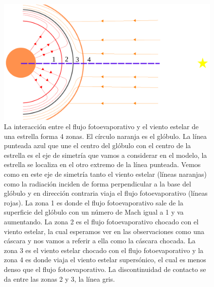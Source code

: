 \documentclass{book}
\begin{document}
\begin{figure}[htb]
    \centering    \includegraphics[width=\textwidth]{imagenes_corregidas/Arreglo 01.pdf}
    \caption{La interacción entre el flujo fotoevaporativo y el viento
      estelar de una estrella forma 4 zonas. El círculo naranja es el
      glóbulo. La línea punteada azul que une el centro del glóbulo
      con el centro de la estrella es el eje de simetría que vamos a
      considerar en el modelo, la estrella se localiza en el otro
      extremo de la línea punteada. Vemos como en este eje de simetría
      tanto el viento estelar (líneas naranjas) como la radiación
      inciden de forma perpendicular a la base del glóbulo y en
      dirección contraria viaja el flujo fotoevaporativo (líneas
      rojas). La zona 1 es donde el flujo fotoevaporativo sale de la
      superficie del glóbulo con un número de Mach igual a 1 y va
      aumentando. La zona 2 es el flujo fotoevaporativo chocado con el
      viento estelar, la cual esperamos ver en las observaciones como
      una cáscara y nos vamos a referir a ella como la cáscara
      chocada. La zona 3 es el viento estelar chocado con el flujo
      fotoevaporativo y la zona 4 es donde viaja el viento estelar
      supersónico, el cual es menos denso que el flujo
      fotoevaporativo. La discontinuidad de contacto se da entre las
      zonas 2 y 3, la línea gris.}
    \label{fig:zones}
\end{figure}
\end{document}
